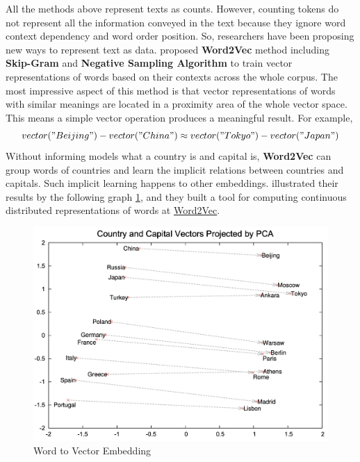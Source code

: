 \documentclass[aoas]{imsart}
\numberwithin{equation}{section}
\theoremstyle{plain}
\theoremstyle{remark}
\begin{document}
All the methods above represent texts as counts. However, counting tokens do not represent all the information conveyed in the text because they ignore word context dependency and word order position. So, researchers have been proposing new ways to represent text as data. \cite{DBLP:journals/corr/MikolovSCCD13} proposed \textbf{Word2Vec} method including \textbf{Skip-Gram} and \textbf{Negative Sampling Algorithm} to train vector representations of words based on their contexts across the whole corpus. The most impressive aspect of this method is that vector representations of words with similar meanings are located in a proximity area of the whole vector space. This means a simple vector operation produces a meaningful result. For example, $$vector("Beijing") - vector("China") \approx vector("Tokyo") - vector("Japan")$$ Without informing models what a country is and capital is, \textbf{Word2Vec} can group words of countries and learn the implicit relations between countries and capitals. Such implicit learning happens to other embeddings. \cite{DBLP:journals/corr/MikolovSCCD13} illustrated their results by the following graph \ref{Fig2: city}, and they built a tool for computing continuous distributed representations of words at \href{https://code.google.com/archive/p/word2vec/}{Word2Vec}.
\begin{figure}[ht]
\includegraphics[scale=0.4]{img/city.png}
\caption{Word to Vector Embedding}
\label{Fig2: city}
\end{figure}
\end{document}
